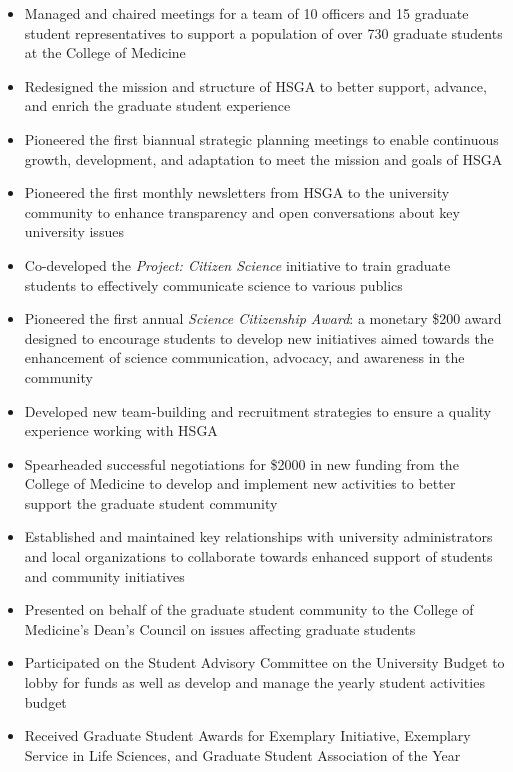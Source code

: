 \documentclass[10pt,a4paper,]{article}
\providecommand{\tightlist}{%
  \setlength{\itemsep}{0pt}\setlength{\parskip}{0pt}}
\begin{document}
\begin{itemize}
\tightlist
\item
  Managed and chaired meetings for a team of 10 officers and 15 graduate
  student representatives to support a population of over 730 graduate
  students at the College of Medicine
\item
  Redesigned the mission and structure of HSGA to better support,
  advance, and enrich the graduate student experience
\item
  Pioneered the first biannual strategic planning meetings to enable
  continuous growth, development, and adaptation to meet the mission and
  goals of HSGA
\item
  Pioneered the first monthly newsletters from HSGA to the university
  community to enhance transparency and open conversations about key
  university issues
\item
  Co-developed the \emph{Project: Citizen Science} initiative to train
  graduate students to effectively communicate science to various
  publics
\item
  Pioneered the first annual \emph{Science Citizenship Award}: a
  monetary \$200 award designed to encourage students to develop new
  initiatives aimed towards the enhancement of science communication,
  advocacy, and awareness in the community
\item
  Developed new team-building and recruitment strategies to ensure a
  quality experience working with HSGA
\item
  Spearheaded successful negotiations for \$2000 in new funding from the
  College of Medicine to develop and implement new activities to better
  support the graduate student community
\item
  Established and maintained key relationships with university
  administrators and local organizations to collaborate towards enhanced
  support of students and community initiatives
\item
  Presented on behalf of the graduate student community to the College
  of Medicine's Dean's Council on issues affecting graduate students
\item
  Participated on the Student Advisory Committee on the University
  Budget to lobby for funds as well as develop and manage the yearly
  student activities budget
\item
  Received Graduate Student Awards for Exemplary Initiative, Exemplary
  Service in Life Sciences, and Graduate Student Association of the Year
\end{itemize}
\end{document}
